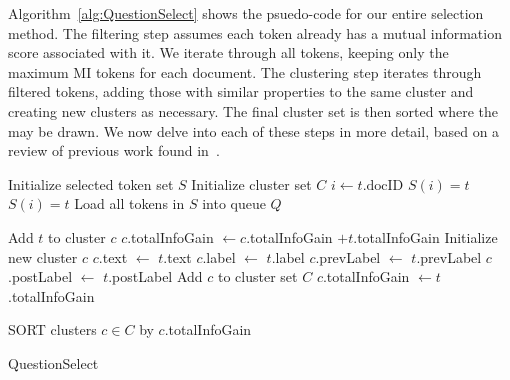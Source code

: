 Algorithm~\ref{alg:QuestionSelect} shows the psuedo-code for our entire selection method.  The filtering step assumes each token already has a mutual information score associated with it.  We iterate through all tokens, keeping only the maximum MI tokens for each document.  The clustering step iterates through filtered tokens, adding those with similar properties to the same cluster and creating new clusters as necessary.  The final cluster set is then sorted where the \topk may be drawn.  We now delve into each of these steps in more detail, based on a review of previous work found in~\cite{castleHcomp}.

\begin{algorithm}[fillcomment]
\label{alg:QuestionSelect}
\BlankLine
\lnl{}Initialize selected token set $S$\;
\lnl{}Initialize cluster set $C$\;
\;
{
	\lnl{}$i \leftarrow t.\text{docID}$\;	
	\lnl{}
	{
		\lnl{}$S(i) = t$\; 	
	}	
	\lnl{}
	{
		$S(i) = t$\;
	}
}
\;
Load all tokens in $S$ into queue $Q$\;
\lnl{}
{
	\lnl{}
	{
		\lnl{}
			{
				\lnl{}Add $t$ to cluster $c$\;
				\lnl{}$c$.totalInfoGain $\leftarrow c$.totalInfoGain $+ t$.totalInfoGain\;
			}
	}
	\lnl{}
	{
		\lnl{}Initialize new cluster $c$\;
		\lnl{}$c$.text $\leftarrow$ $t$.text\;
		\lnl{}$c$.label $\leftarrow$ $t$.label\;
		\lnl{}$c$.prevLabel $\leftarrow$ $t$.prevLabel\;
		\lnl{}$c$.postLabel $\leftarrow$ $t$.postLabel\;
		\lnl{}Add $c$ to cluster set $C$\;
                     $c$.totalInfoGain $\leftarrow t$.totalInfoGain
	}
	
}
\;
\lnl{}SORT clusters $c \in C$ by $c$.totalInfoGain\;

\caption{QuestionSelect}
\end{algorithm}


